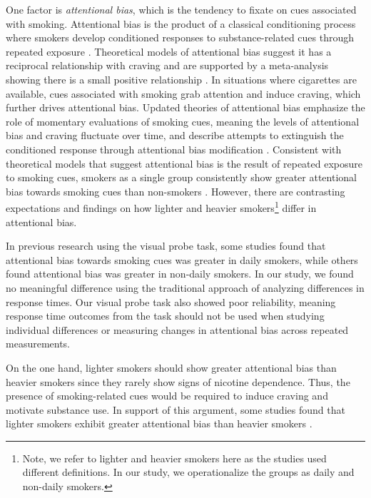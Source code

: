 \documentclass[empirical, authordate]{jote-new-article}
\begin{document}
One factor is \emph{attentional bias}, which is the tendency to fixate on cues associated with smoking. Attentional bias is the product of a classical conditioning process where smokers develop conditioned responses to substance-related cues through repeated exposure \parencite{Field2008}. Theoretical models of attentional bias suggest it has a reciprocal relationship with craving and are supported by a meta-analysis showing there is a small positive relationship \parencite{Field2009}. In situations where cigarettes are available, cues associated with smoking grab attention and induce craving, which further drives attentional bias. Updated theories of attentional bias emphasize the role of momentary evaluations of smoking cues, meaning the levels of attentional bias and craving fluctuate over time, and describe attempts to extinguish the conditioned response through attentional bias modification \parencite{Field2016}. Consistent with theoretical models that suggest attentional bias is the result of repeated exposure to smoking cues, smokers as a single group consistently show greater attentional bias towards smoking cues than non-smokers \parencite{Baschnagel2013, Ehrman2002, Kang2012, Mogg2003}. However, there are contrasting expectations and findings on how lighter and heavier smokers\footnote{Note, we refer to lighter and heavier smokers here as the studies used different definitions. In our study, we operationalize the groups as daily and non-daily smokers.} differ in attentional bias.

\begin{takeHomeMessage}
  In previous research using the visual probe task, some studies found that attentional bias towards smoking cues was greater in daily smokers, while others found attentional bias was greater in non-daily smokers. In our study, we found no meaningful difference using the traditional approach of analyzing differences in response times. Our visual probe task also showed poor reliability, meaning response time outcomes from the task should not be used when studying individual differences or measuring changes in attentional bias across repeated measurements.
\end{takeHomeMessage}
On the one hand, lighter smokers should show greater attentional bias than heavier smokers since they rarely show signs of nicotine dependence. Thus, the presence of smoking-related cues would be required to induce craving and motivate substance use. In support of this argument, some studies found that lighter smokers exhibit greater attentional bias than heavier smokers \parencite{Bradley2003, Hogarth2003, Mogg2005}.
\end{document}
